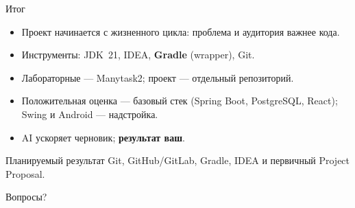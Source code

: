 \begin{frame}{Итог}
  \begin{itemize}\setlength\itemsep{0.32em}
    \item Проект начинается с жизненного цикла: проблема и аудитория важнее кода.
    \item Инструменты: JDK~21, IDEA, \textbf{Gradle} (wrapper), Git.
    \item Лабораторные --- Manytask2; проект --- отдельный репозиторий.
    \item Положительная оценка --- базовый стек (Spring Boot, PostgreSQL, React);
          Swing и Android --- надстройка.
    \item AI ускоряет черновик; \textbf{результат ваш}.
  \end{itemize}

  \vspace{0.7em}
  \begin{block}{Планируемый результат}
    Git, GitHub/GitLab, Gradle, IDEA и первичный Project Proposal.
  \end{block}

  \vspace{0.5em}
  {\small\color{acGray}Вопросы?}
\end{frame}
